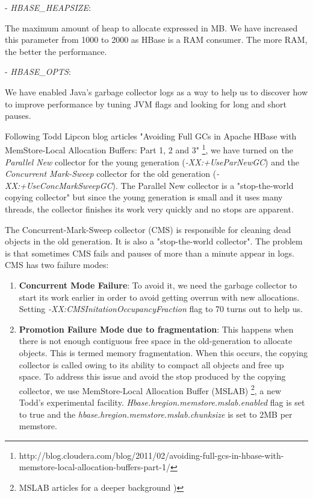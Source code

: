 \begin{enumerate}
- \textit{HBASE\_HEAPSIZE}: 
\par
The maximum amount of heap to allocate expressed in MB. We have increased this parameter from 1000 to 2000 as HBase is a RAM consumer. The more RAM, the better the performance.
\par
- \textit{HBASE\_OPTS}:
\par
We have enabled Java's garbage collector logs as a way to help us to discover how to improve performance by tuning JVM flags and looking for long and short pauses. 
\par
Following Todd Lipcon blog articles "Avoiding Full GCs in Apache HBase with MemStore-Local Allocation Buffers: Part 1, 2 and 3" \footnote{http://blog.cloudera.com/blog/2011/02/avoiding-full-gcs-in-hbase-with-memstore-local-allocation-buffers-part-1/}, we have turned on the \textit{Parallel New} collector for the young generation (\textit{-XX:+UseParNewGC}) and the \textit{Concurrent Mark-Sweep} collector for the old generation (\textit{-XX:+UseConcMarkSweepGC}). The Parallel New collector is a "stop-the-world copying collector" but since the young generation is small and it uses many threads, the collector finishes its work very quickly and no stops are apparent.
\par
The Concurrent-Mark-Sweep collector (CMS) is responsible for cleaning dead objects in the old generation. It is also a "stop-the-world collector". The problem is that sometimes CMS fails and pauses of more than a minute appear in logs. CMS has two failure modes:
\begin{enumerate}
\item \textbf{Concurrent Mode Failure}: To avoid it, we need the garbage collector to start its work earlier in order to avoid getting overrun with new allocations. Setting \textit{-XX:CMSInitationOccupancyFraction} flag to 70 turns out to help us.
\item \textbf{Promotion Failure Mode due to fragmentation}: This happens when there is not enough contiguous free space in the old-generation to allocate objects. This is termed memory fragmentation. When this occurs, the copying collector is called owing to its ability to compact all objects and free up space. To address this issue and avoid the stop produced by the copying collector, we use MemStore-Local Allocation Buffer (MSLAB) \footnote{MSLAB articles for a deeper background \cite{ApacheHBaseMSLAB} \cite{MSLAB})}, a new Todd's experimental facility.  \textit{Hbase.hregion.memstore.mslab.enabled} flag is set to true and the \textit{hbase.hregion.memstore.mslab.chunksize} is set to 2MB per memstore.


\end{enumerate}
\end{enumerate}
